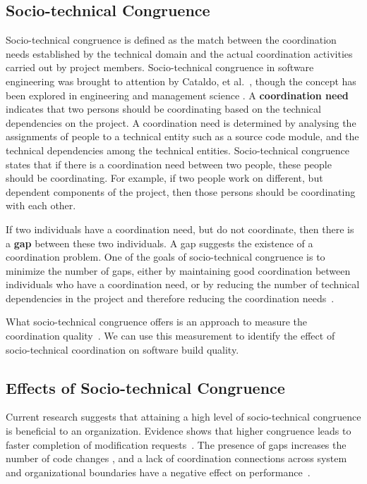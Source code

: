 \subsection{Socio-technical Congruence}
Socio-technical congruence is defined as the match between the coordination needs established by the technical domain and the actual coordination activities carried out by project members. Socio-technical congruence in software engineering was brought to attention by Cataldo, et al.~\cite{cataldo:cscw:2006}, though the concept has been explored in engineering \cite{browning2001} and management science \cite{henderson1990}. A \textbf{coordination need} indicates that two persons should be coordinating based on the technical dependencies on the project. A coordination need is determined by analysing the assignments of people to a technical entity such as a source code module, and the technical dependencies among the technical entities.
Socio-technical congruence states that if there is a coordination need between two people, these people should be coordinating.
For example, if two people work on different, but dependent components of the project, then those persons should be coordinating with each other.

If two individuals have a coordination need, but do not coordinate, then there is a \textbf{gap} between these two individuals. A gap suggests the existence of a coordination problem. One of the goals of socio-technical congruence is to minimize the number of gaps, either by maintaining good coordination between individuals who have a coordination need, or by reducing the number of technical dependencies in the project and therefore reducing the coordination needs~\cite{sarma2008:measuring_stc}.

What socio-technical congruence offers is an approach to measure the coordination quality~\cite{cataldo:cscw:2006}. We can use this measurement to identify the effect of socio-technical coordination on software build quality.





\subsection{Effects of Socio-technical Congruence}
Current research suggests that attaining a high level of socio-technical congruence is beneficial to an organization.
Evidence shows that higher congruence leads to faster completion of modification requests~\cite{cataldo:cscw:2006}. 
The presence of gaps increases the number of code changes \cite{ehrlich2008:gaps}, and a lack of coordination connections across system and organizational boundaries have a negative effect on performance~\cite{sosa2004:manage}.

